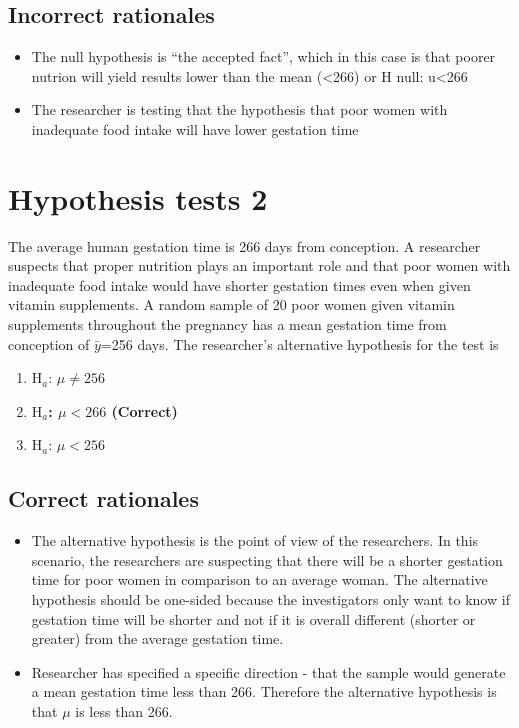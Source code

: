 \documentclass[letterpaper,9pt,twoside,printwatermark=false]{pinp}
\providecommand{\tightlist}{%
  \setlength{\itemsep}{0pt}\setlength{\parskip}{0pt}}
\begin{document}
\subsection{Incorrect rationales}\label{incorrect-rationales}

\begin{itemize}
\tightlist
\item
  The null hypothesis is ``the accepted fact'', which in this case is
  that poorer nutrion will yield results lower than the mean
  (\textless{}266) or H null: u\textless{}266
\item
  The researcher is testing that the hypothesis that poor women with
  inadequate food intake will have lower gestation time
\end{itemize}

\section{Hypothesis tests 2}\label{hypothesis-tests-2}

The average human gestation time is 266 days from conception. A
researcher suspects that proper nutrition plays an important role and
that poor women with inadequate food intake would have shorter gestation
times even when given vitamin supplements. A random sample of 20 poor
women given vitamin supplements throughout the pregnancy has a mean
gestation time from conception of \(\bar{y}\)=256 days. The researcher's
alternative hypothesis for the test is

\begin{enumerate}
\def\labelenumi{\alph{enumi}.}
\tightlist
\item
  \(\textrm{H}_a\): \(\mu \neq 256\)
\item
  \textbf{\(\textrm{H}_a\): \(\mu < 266\) (Correct)}
\item
  \(\textrm{H}_a\): \(\mu < 256\)
\end{enumerate}

\subsection{Correct rationales}\label{correct-rationales-1}

\begin{itemize}
\tightlist
\item
  The alternative hypothesis is the point of view of the researchers. In
  this scenario, the researchers are suspecting that there will be a
  shorter gestation time for poor women in comparison to an average
  woman. The alternative hypothesis should be one-sided because the
  investigators only want to know if gestation time will be shorter and
  not if it is overall different (shorter or greater) from the average
  gestation time.
\item
  Researcher has specified a specific direction - that the sample would
  generate a mean gestation time less than 266. Therefore the
  alternative hypothesis is that \(\mu\) is less than 266.
\end{itemize}
\end{document}
